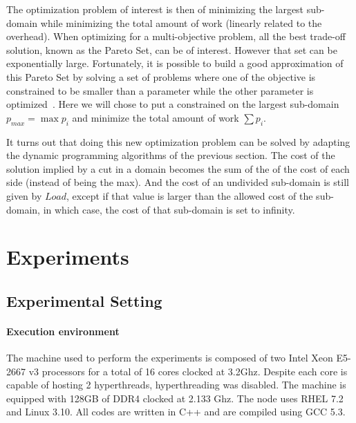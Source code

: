 \documentclass[10pt, conference, compsocconf]{IEEEtran}
\begin{document}
The optimization problem of interest is then of minimizing the largest
sub-domain while minimizing the total amount of work (linearly related
to the overhead). When optimizing for a multi-objective problem, all
the best trade-off solution, known as the Pareto Set, can be of
interest. However that set can be exponentially large. Fortunately, it
is possible to build a good approximation of this Pareto Set by
solving a set of problems where one of the objective is constrained to
be smaller than a parameter while the other parameter is
optimized~\cite{papayanna2000:pareto}. Here we will chose to put a
constrained on the largest sub-domain $p_{max} = \max p_i$ and minimize
the total amount of work $\sum p_i$.

It turns out that doing this new optimization problem can be solved by
adapting the dynamic programming algorithms of the previous
section. The cost of the solution implied by a cut in a domain becomes
the sum of the of the cost of each side (instead of being the
max). And the cost of an undivided sub-domain is still given by $Load$,
except if that value is larger than the allowed cost of the sub-domain,
in which case, the cost of that sub-domain is set to infinity.

\section{Experiments}
\label{sec:experiments}

\subsection{Experimental Setting}

\paragraph{Execution environment} The machine used to perform the experiments is
composed of two Intel Xeon E5-2667 v3 processors for a total of
16 cores clocked at 3.2Ghz. Despite each core is capable of hosting 2
hyperthreads, hyperthreading was disabled. The machine is equipped with
128GB of DDR4 clocked at 2.133 Ghz. The node uses RHEL 7.2
and Linux 3.10. All codes are written in C++ and are compiled using GCC 5.3.
\end{document}

